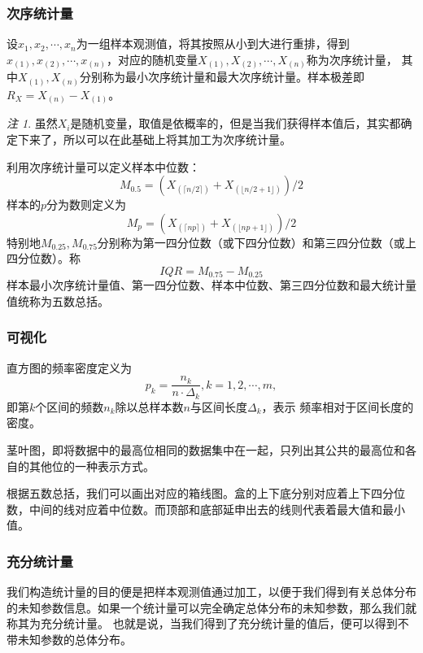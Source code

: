 \documentclass[a4paper,11pt]{article}%
\theoremstyle{remark}
\newtheorem*{remark}{注}
\theoremstyle{remark}
\theoremstyle{definition}
\theoremstyle{definition}
\theoremstyle{plain}
\begin{document}
\subsubsection{次序统计量}
设$x_1,x_2,\cdots,x_n$为一组样本观测值，将其按照从小到大进行重排，得到$x_{(1)},x_{(2)},\cdots,x_{(n)}$，对应的随机变量$X_{(1)},X_{(2)},\cdots,X_{(n)}$称为次序统计量，
其中$X_{(1)},X_{(n)}$分别称为最小次序统计量和最大次序统计量。样本极差即$R_X=X_{(n)}-X_{(1)}$。
\begin{remark}
    虽然$X_i$是随机变量，取值是依概率的，但是当我们获得样本值后，其实都确定下来了，所以可以在此基础上将其加工为次序统计量。
\end{remark}
利用次序统计量可以定义样本中位数：
\[M_{0.5}=(X_{(\lceil n/2\rceil)}+X_{(\lfloor n/2 +1\rfloor)})/2\]
样本的$p$分为数则定义为
\[M_{p}=(X_{(\lceil np\rceil)}+X_{(\lfloor np +1\rfloor)})/2\]
特别地$M_{0.25},M_{0.75}$分别称为第一四分位数（或下四分位数）和第三四分位数（或上四分位数）。称 
\[IQR=M_{0.75}-M_{0.25}\]
样本最小次序统计量值、第一四分位数、样本中位数、第三四分位数和最大统计量值统称为五数总括。
\subsubsection{可视化}
直方图的频率密度定义为
\[p_k=\frac{n_k}{n\cdot\Delta_k},k=1,2,\cdots,m,\]
即第$k$个区间的频数$n_k$除以总样本数$n$与区间长度$\Delta_k$，表示 频率相对于区间长度的密度。

茎叶图，即将数据中的最高位相同的数据集中在一起，只列出其公共的最高位和各自的其他位的一种表示方式。

根据五数总括，我们可以画出对应的箱线图。盒的上下底分别对应着上下四分位数，中间的线对应着中位数。而顶部和底部延申出去的线则代表着最大值和最小值。
\subsubsection{充分统计量}
我们构造统计量的目的便是把样本观测值通过加工，以便于我们得到有关总体分布的未知参数信息。如果一个统计量可以完全确定总体分布的未知参数，那么我们就称其为充分统计量。
也就是说，当我们得到了充分统计量的值后，便可以得到不带未知参数的总体分布。
\end{document}
